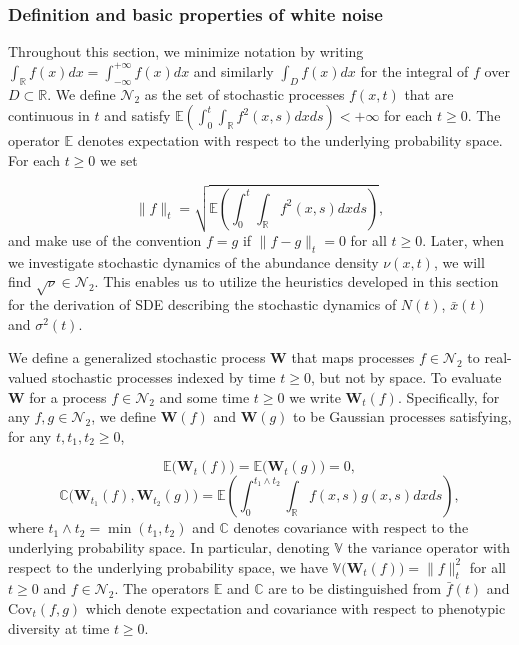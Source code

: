 \documentclass[]{elsarticle} %
\begin{document}
\hypertarget{definition-and-basic-properties-of-white-noise}{%
\subsubsection{\texorpdfstring{Definition and basic properties of white
noise
\label{wnc_intro}}{Definition and basic properties of white noise }}\label{definition-and-basic-properties-of-white-noise}}

Throughout this section, we minimize notation by writing
\(\int_{\mathbb{R}}f(x)dx=\int_{-\infty}^{+\infty}f(x)dx\) and similarly
\(\int_Df(x)dx\) for the integral of \(f\) over \(D\subset\mathbb{R}\).
We define \(\mathscr{N}_2\) as the set of stochastic processes
\(f(x,t)\) that are continuous in \(t\) and satisfy
\(\mathbb{E}\left(\int_0^t\int_\mathbb{R}f^2(x,s)dxds\right)<+\infty\)
for each \(t\geq0\). The operator \(\mathbb{E}\) denotes expectation
with respect to the underlying probability space. For each \(t\geq0\) we
set

\begin{equation}
\|f\|_t=\sqrt{\mathbb{E}\left(\int_0^t\int_\mathbb{R}f^2(x,s)dxds\right)},
\end{equation} and make use of the convention \(f=g\) if \(\|f-g\|_t=0\)
for all \(t\geq0\). Later, when we investigate stochastic dynamics of
the abundance density \(\nu(x,t)\), we will find
\(\sqrt\nu\in\mathscr{N}_2\). This enables us to utilize the heuristics
developed in this section for the derivation of SDE describing the
stochastic dynamics of \(N(t)\), \(\bar x(t)\) and \(\sigma^2(t)\).

We define a generalized stochastic process \(\mathbf W\) that maps
processes \(f\in\mathscr{N}_2\) to real-valued stochastic processes
indexed by time \(t\geq0\), but not by space. To evaluate \(\mathbf W\)
for a process \(f\in\mathscr{N}_2\) and some time \(t\geq0\) we write
\(\mathbf W_t(f)\). Specifically, for any \(f,g\in\mathscr{N}_2\), we
define \(\mathbf W(f)\) and \(\mathbf W(g)\) to be Gaussian processes
satisfying, for any \(t,t_1,t_2\geq0\),

\begin{equation}\label{exp_WN}
\mathbb{E}\big(\mathbf W_t(f)\big)=\mathbb{E}\big(\mathbf W_t(g)\big)=0,
\end{equation} \begin{equation}\label{cov_WN}
\mathbb{C}\big(\mathbf W_{t_1}(f),\mathbf W_{t_2}(g)\big)=\mathbb{E}\left(\int_0^{t_1\wedge t_2}\int_\mathbb{R} f(x,s)g(x,s)dxds\right),
\end{equation} where \(t_1\wedge t_2=\min(t_1,t_2)\) and \(\mathbb{C}\)
denotes covariance with respect to the underlying probability space. In
particular, denoting \(\mathbb{V}\) the variance operator with respect
to the underlying probability space, we have
\(\mathbb{V}\big(\mathbf W_t(f)\big)=\|f\|_t^2\) for all \(t\geq0\) and
\(f\in\mathscr{N}_2\). The operators \(\mathbb{E}\) and \(\mathbb{C}\)
are to be distinguished from \(\bar f(t)\) and \(\mathrm{Cov}_t(f,g)\)
which denote expectation and covariance with respect to phenotypic
diversity at time \(t\geq0\).
\end{document}
